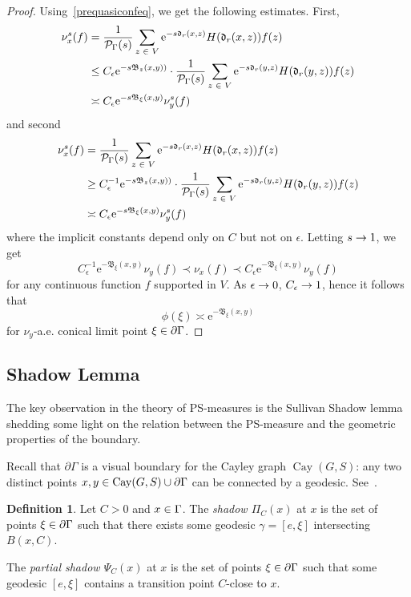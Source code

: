 \documentclass[10pt]{amsart}
\theoremstyle{definition}\newtheorem{defi}[theo]{Definition}\newtheorem{rema}[theo]{Remark}\newtheorem{exam}[theo]{Example}\newtheorem{exem}[theo]{Example}\newtheorem{nota}[theo]{Notation}
\newcommand{\pG}{\partial{\Gamma}}
\newcommand{\rme}{\mathrm{e}}
\newcommand{\fkd}{\mathfrak{d}}
\newcommand{\fkB}{\mathfrak{B}}
\newcommand{\clP}{\mathcal{P}}
\DeclareMathOperator{\Cay}{Cay}
\let\oldin\in
\renewcommand{\in}{\mathchoice{\oldin}{\oldin}{\,\oldin\,}{\,\oldin\,}}
\renewcommand*{\to}{\mathchoice{\longrightarrow}{\rightarrow}{\rightarrow}{\rightarrow}}
\begin{document}
\begin{proof}
Using~\eqref{prequasiconfeq}, we get the following estimates. First,
\begin{align*}
\nu^s_x(f) & = \frac{1}{\clP_{\Gamma}(s)} \sum\limits_{z \in V}
\rme^{-s \fkd_r(x,z)} H(\fkd_r(x,z)) {f(z)} \\
& \leq C_\epsilon \rme^{-s\fkB_{z}(x, y))}\cdot \frac{1}{\clP_{\Gamma}(s)}
\sum\limits_{z \in V}
\rme^{-s\fkd_r(y, z)} H(\fkd_r(y, z)) {f(z)}\\
& \asymp C_\epsilon \rme^{-s\fkB_\xi(x, y)} \nu^s_y(f)
\end{align*}
and second
\begin{align*}
\nu^s_x(f) & = \frac{1}{\clP_{\Gamma}(s)} \sum\limits_{z \in V}
\rme^{-s \fkd_r(x,z)} H(\fkd_r(x,z)) {f(z)} \\
& \geq C_\epsilon^{-1} \rme^{-s\fkB_{z}(x, y))}\cdot \frac{1}{\clP_{\Gamma}(s)}
\sum\limits_{z \in V}
\rme^{-s\fkd_r(y, z)} H(\fkd_r(y, z)) {f(z)}\\
& \asymp C_\epsilon \rme^{-s\fkB_\xi(x, y)} \nu^s_y(f)
\end{align*}
where the implicit constants depend only on $C$ but not on $\epsilon$. Letting $s\to 1$, we get
\[
C_\epsilon^{-1} \rme^{-\fkB_\xi(x, y)}\nu_y(f)\prec \nu_x(f) \prec C_\epsilon \rme^{-\fkB_\xi(x, y)} \nu_y(f)
\]
for any continuous function $f$ supported in $V$. As $\epsilon\to 0$, $C_\epsilon\to 1$, hence it follows that
\[
\phi(\xi) \asymp \rme^{-
\fkB_\xi (x, y)}
\]
for $\nu_y$-a.e. conical limit point $\xi \in \pG$.
\end{proof}

\subsection{Shadow Lemma}

The key observation in the theory of PS-measures is the Sullivan Shadow lemma shedding some light on the relation between the PS-measure and the geometric properties of the boundary.

Recall that $\partial \Gamma$ is a visual boundary for the Cayley graph $\Cay(G,S)$: any two distinct points $x,y\in \Cay(G,S)\cup \partial \Gamma$ can be connected by a geodesic. See~\cite[Proposition~2.4]{GePoJEMS}.

\begin{defi}
Let $C>0$ and $x \in\Gamma$. The \emph{shadow $\Pi_C(x)$} at $x$ is the set of points $\xi \in \pG$ such that there exists some geodesic $\gamma=[e, \xi]$ intersecting $B(x, C)$.

The \emph{partial shadow $ \Psi_{C}(x)$} at $x$ is the set of points $\xi \in \pG$ such that some geodesic $[e,\xi]$ contains a transition point $C$-close to $x$.
\end{defi}
\end{document}
